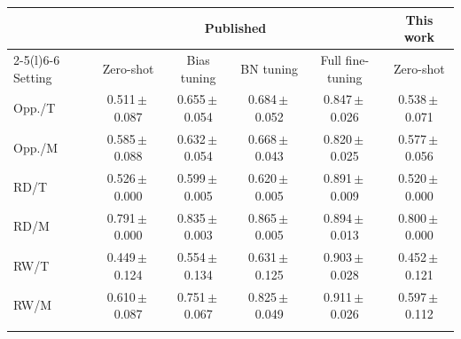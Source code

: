 \begin{tabular}{@{}l ccccc@{}}
\toprule
 & \multicolumn{4}{c}{Published~\cite{akbulut2026memflora}} & This work \\
\cmidrule(lr){2-5}\cmidrule(l){6-6}
Setting & Zero-shot & Bias tuning & BN tuning & Full fine-tuning & Zero-shot \\
\midrule
Opp./T & 0.511\,{\scriptsize$\pm$\,0.087} & 0.655\,{\scriptsize$\pm$\,0.054} & 0.684\,{\scriptsize$\pm$\,0.052} & 0.847\,{\scriptsize$\pm$\,0.026} & 0.538\,{\scriptsize$\pm$\,0.071} \\
Opp./M & 0.585\,{\scriptsize$\pm$\,0.088} & 0.632\,{\scriptsize$\pm$\,0.054} & 0.668\,{\scriptsize$\pm$\,0.043} & 0.820\,{\scriptsize$\pm$\,0.025} & 0.577\,{\scriptsize$\pm$\,0.056} \\
RD/T & 0.526\,{\scriptsize$\pm$\,0.000} & 0.599\,{\scriptsize$\pm$\,0.005} & 0.620\,{\scriptsize$\pm$\,0.005} & 0.891\,{\scriptsize$\pm$\,0.009} & 0.520\,{\scriptsize$\pm$\,0.000} \\
RD/M & 0.791\,{\scriptsize$\pm$\,0.000} & 0.835\,{\scriptsize$\pm$\,0.003} & 0.865\,{\scriptsize$\pm$\,0.005} & 0.894\,{\scriptsize$\pm$\,0.013} & 0.800\,{\scriptsize$\pm$\,0.000} \\
RW/T & 0.449\,{\scriptsize$\pm$\,0.124} & 0.554\,{\scriptsize$\pm$\,0.134} & 0.631\,{\scriptsize$\pm$\,0.125} & 0.903\,{\scriptsize$\pm$\,0.028} & 0.452\,{\scriptsize$\pm$\,0.121} \\
RW/M & 0.610\,{\scriptsize$\pm$\,0.087} & 0.751\,{\scriptsize$\pm$\,0.067} & 0.825\,{\scriptsize$\pm$\,0.049} & 0.911\,{\scriptsize$\pm$\,0.026} & 0.597\,{\scriptsize$\pm$\,0.112} \\
\botrule
\end{tabular}

